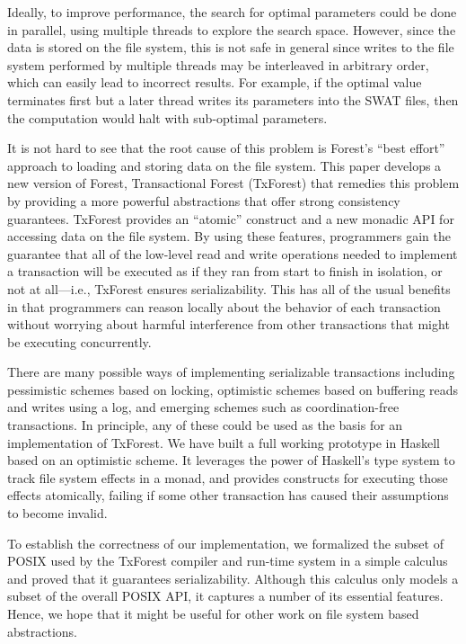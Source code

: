 %
%
Ideally, to improve performance, the search for optimal parameters
could be done in parallel, using multiple threads to explore the
search space. However, since the data is stored on the file system,
this is not safe in general since writes to the file system performed
by multiple threads may be interleaved in arbitrary order, which can
easily lead to incorrect results. For example, if the optimal value
terminates first but a later thread writes its parameters into the
SWAT files, then the computation would halt with sub-optimal
parameters.

%
%
It is not hard to see that the root cause of this problem is Forest's
``best effort'' approach to loading and storing data on the file
system. This paper develops a new version of Forest, Transactional
Forest (TxForest) that remedies this problem by providing a more
powerful abstractions that offer strong consistency
guarantees. TxForest provides an ``atomic'' construct and a new
monadic API for accessing data on the file system. By using these
features, programmers gain the guarantee that all of the low-level
read and write operations needed to implement a transaction will be
executed as if they ran from start to finish in isolation, or not at
all---i.e., TxForest ensures serializability. This has all of the
usual benefits in that programmers can reason locally about the
behavior of each transaction without worrying about harmful
interference from other transactions that might be executing
concurrently.

%
%
There are many possible ways of implementing serializable transactions
including pessimistic schemes based on locking, optimistic schemes
based on buffering reads and writes using a log, and emerging schemes
such as coordination-free transactions. In principle, any of these
could be used as the basis for an implementation of TxForest. We have
built a full working prototype in Haskell based on an optimistic
scheme. It leverages the power of Haskell's type system to track file
system effects in a monad, and provides constructs for executing those
effects atomically, failing if some other transaction has caused their
assumptions to become invalid.

%
%
To establish the correctness of our implementation, we formalized the
subset of POSIX used by the TxForest compiler and run-time system in a
simple calculus and proved that it guarantees serializability.
Although this calculus only models a subset of the overall POSIX API,
it captures a number of its essential features. Hence, we hope that it
might be useful for other work on file system based abstractions.


